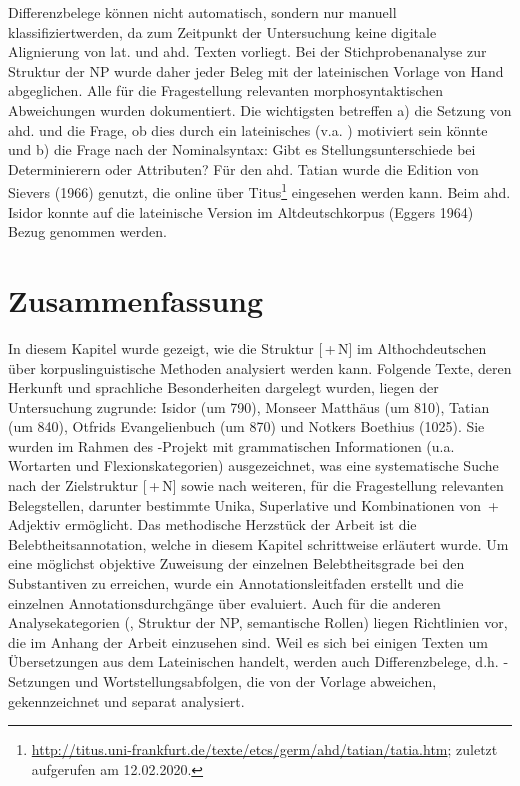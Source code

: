 Differenzbelege  können nicht automatisch, sondern nur manuell klassifiziert\linebreak werden, da zum Zeitpunkt der Untersuchung keine digitale Alignierung von lat. und ahd. Texten vorliegt. Bei der Stichprobenanalyse zur Struktur der NP  wurde daher jeder Beleg mit der lateinischen Vorlage von Hand abgeglichen. Alle für die Fragestellung relevanten morphosyntaktischen Abweichungen wurden dokumentiert. Die wichtigsten betreffen a) die Setzung von ahd.  und die Frage, ob dies durch ein lateinisches  (v.a. ) motiviert sein könnte und b) die Frage nach der Nominalsyntax: Gibt es Stellungsunterschiede bei  Determinierern oder Attributen? Für den ahd. Tatian wurde die Edition von Sievers (1966) genutzt, die online über Titus\footnote{\url{http://titus.uni-frankfurt.de/texte/etcs/germ/ahd/tatian/tatia.htm}; zuletzt aufgerufen am 12.02.2020.} eingesehen werden kann. Beim ahd. Isidor konnte auf die lateinische Version im Altdeutschkorpus  (Eggers 1964) Bezug genommen werden.  


\section{Zusammenfassung}

In diesem Kapitel wurde gezeigt, wie die Struktur [\,+\,N] im Althochdeutschen über korpuslinguistische  Methoden analysiert werden kann. Folgende Texte, deren Herkunft und sprachliche Besonderheiten dargelegt wurden, liegen der Untersuchung zugrunde: Isidor (um 790), Monseer Matthäus (um 810), Tatian (um 840), Otfrids Evangelienbuch (um 870) und Notkers Boethius (1025). Sie wurden im Rahmen des -Projekt  mit grammatischen Informationen (u.a. Wortarten und Flexionskategorien) ausgezeichnet, was eine systematische Suche nach der Zielstruktur [\,+\,N] sowie nach weiteren, für die Fragestellung relevanten Belegstellen, darunter bestimmte Unika, Superlative und Kombinationen von \,+\,Adjektiv ermöglicht. Das methodische Herzstück der Arbeit ist die  Belebtheitsannotation, welche in diesem Kapitel schrittweise erläutert wurde. Um eine möglichst objektive Zuweisung der einzelnen Belebtheitsgrade bei den Substantiven zu erreichen, wurde ein Annotationsleitfaden  erstellt und die einzelnen  Annotationsdurchgänge über  evaluiert. Auch für die anderen Analysekategorien (, Struktur der  NP, semantische Rollen) liegen Richtlinien vor, die im Anhang \parencite{HZKYL4_2020} der Arbeit einzusehen sind. Weil es sich bei einigen Texten um Übersetzungen aus dem Lateinischen handelt, werden auch  Differenzbelege, d.h. -Setzungen  und Wortstellungsabfolgen, die von der Vorlage abweichen, gekennzeichnet und separat analysiert. 
  
